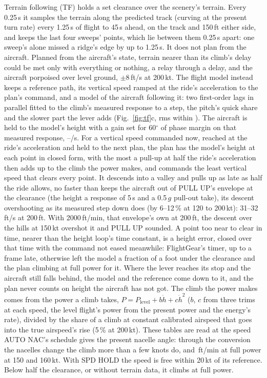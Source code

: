 \documentclass[10pt,a4paper,twocolumn]{article}
\begin{document}
Terrain following (TF) holds a set clearance over the scenery's terrain. Every 0.25\,s it samples the terrain along the predicted track
(curving at the present turn rate) every 1.25\,s of flight to 45\,s ahead, on the track and 150\,ft either side, and keeps the last four
sweeps' points, which lie between them 0.25\,s apart: one sweep's alone missed a ridge's edge by up to 1.25\,s. It does not plan from the
aircraft. Planned from the aircraft's state, terrain nearer than its climb's delay could be met only with everything or nothing, a relay
through a delay, and the aircraft porpoised over level ground, $\pm$8\,ft/s at 200\,kt. The flight model instead keeps a reference path, its
vertical speed ramped at the ride's acceleration to the plan's command, and a model of the aircraft following it: two first-order lags in
parallel fitted to the climb's measured response to a step, the pitch's quick share and the slower part the lever adds (Fig.~\ref{fig:tf}c,
rms within \NTfFitRms). The aircraft is held to the model's height with a gain set for 60$^\circ$ of phase margin on that measured response,
\NTfKLo--\NTfKHi/s. For a vertical speed commanded now, reached at the ride's acceleration and held to the next plan, the plan has the
model's height at each point in closed form, with the most a pull-up at half the ride's acceleration then adds up to the climb the power
makes, and commands the least vertical speed that clears every point. It descends into a valley and pulls up as late as half the ride
allows, no faster than keeps the aircraft out of PULL UP's envelope at the clearance (the height a response of 5\,s and a 0.5\,$g$ pull-out
take), its descent overshooting as its measured step down does (by 6--12\,\% at 120 to 200\,kt): 31--32\,ft/s at 200\,ft. With
2000\,ft/min, that envelope's own at 200\,ft, the descent over the hills at 150\,kt overshot it and PULL UP sounded. A point too near to clear in time, nearer than the height loop's time constant, is a height error, closed over that time with the
command not eased meanwhile: FlightGear's timer, up to a frame late, otherwise left the model a fraction of a foot under the clearance and
the plan climbing at full power for it. Where the lever reaches its stop and the aircraft still falls behind, the model and the reference come
down to it, and the plan never counts on height the aircraft has not got. The climb the power makes comes from the power a climb takes,
$P = P_\mathrm{level} + b\dot h + c\dot h^2$ ($b$, $c$ from three trims at each speed, the level flight's power from the present power and the
energy's rate), divided by the share of a climb at constant calibrated airspeed that goes into the true airspeed's rise (5\,\% at 200\,kt).
These tables are read at the speed AUTO NAC's schedule gives the present nacelle angle: through the conversion the nacelles change the
climb more than a few knots do, \NTfClimbFifty{} and \NTfClimbSixty\,ft/min at full power at 150 and 160\,kt. With SPD HOLD the speed is
free within 20\,kt of its reference. Below half the clearance, or without terrain data, it climbs at full power.
\end{document}
